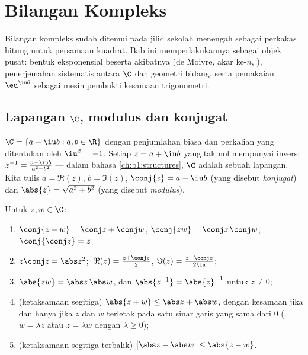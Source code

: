 \chapter{Bilangan Kompleks}\label{ch:b1:complex}

Bilangan kompleks sudah ditemui pada jilid sekolah menengah sebagai
perkakas hitung untuk persamaan kuadrat. Bab ini memperlakukannya
sebagai objek pusat: bentuk eksponensial beserta akibatnya (de Moivre,
akar ke-$n$, ), penerjemahan sistematis antara $\C$ dan
geometri bidang, serta pemakaian $\eu^{\iu\theta}$ sebagai mesin
pembukti kesamaan trigonometri.

\section{Lapangan $\C$, modulus dan konjugat}

\begin{definition}\label{def:b1:complex:field}
$\C = \{a + \iu b : a, b \in \R\}$ dengan penjumlahan biasa dan
perkalian yang ditentukan oleh $\iu^2 = -1$. Setiap $z = a + \iu
b$ yang tak nol mempunyai invers: $z^{-1} = \frac{a - \iu b}{a^2 + b^2}$ --- dalam
bahasa \cref{ch:b1:structures}, $\C$ adalah sebuah lapangan. Kita tulis $a =
\Re(z)$, $b = \Im(z)$, $\conj{z} = a - \iu b$ (yang disebut
\emph{konjugat}) dan $\abs{z} = \sqrt{a^2 + b^2}$
(yang disebut \emph{modulus}).
\end{definition}

\begin{proposition}\label{prop:b1:complex:rules}
Untuk $z, w \in \C$:
\begin{enumerate}
  \item $\conj{z + w} = \conj z + \conj w$, $\conj{zw} = \conj z\,
        \conj w$, $\conj{\conj z} = z$;
  \item $z \conj z = \abs z^2$; $\;\Re(z) = \frac{z + \conj z}{2}$,
        $\Im(z) = \frac{z - \conj z}{2\iu}$;
  \item $\abs{zw} = \abs z\, \abs w$, dan $\abs{z^{-1}} =
        \abs{z}^{-1}$ untuk $z \neq 0$;
  \item (ketaksamaan segitiga) $\abs{z + w}
        \leq \abs z + \abs w$, dengan kesamaan jika dan hanya jika $z$ dan
        $w$ terletak pada satu sinar garis yang sama dari $0$ ($w = \lambda z$ atau
        $z = \lambda w$ dengan $\lambda \geq 0$);
  \item (ketaksamaan segitiga terbalik) $\bigl|\abs z - \abs w\bigr|
        \leq \abs{z - w}$.
\end{enumerate}
\end{proposition}

